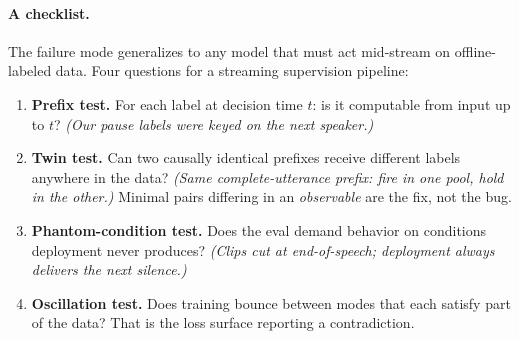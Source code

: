 \documentclass[11pt]{article}
\begin{document}
\paragraph{A checklist.} The failure mode generalizes to any model that must act mid-stream on offline-labeled data. Four questions for a streaming supervision pipeline:

\begin{tcolorbox}[breakable,colback=blue!3!white,colframe=blue!45!black,title=\textbf{Is your supervision clairvoyant?}]
\begin{enumerate}\itemsep2pt
  \item \textbf{Prefix test.} For each label at decision time $t$: is it computable from input up to $t$? \emph{(Our pause labels were keyed on the next speaker.)}
  \item \textbf{Twin test.} Can two causally identical prefixes receive different labels anywhere in the data? \emph{(Same complete-utterance prefix: fire in one pool, hold in the other.)} Minimal pairs differing in an \emph{observable} are the fix, not the bug.
  \item \textbf{Phantom-condition test.} Does the eval demand behavior on conditions deployment never produces? \emph{(Clips cut at end-of-speech; deployment always delivers the next silence.)}
  \item \textbf{Oscillation test.} Does training bounce between modes that each satisfy part of the data? That is the loss surface reporting a contradiction.
\end{enumerate}
\end{tcolorbox}
\end{document}
